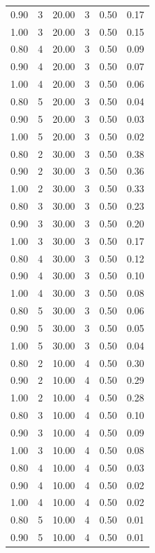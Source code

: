 \documentclass[12pt]{article}
\begin{document}
{{{{\begin{longtable}{cccccc}
  0.90 &   3 & 20.00 &   3 & 0.50 & 0.17 \\ 
  1.00 &   3 & 20.00 &   3 & 0.50 & 0.15 \\ 
  0.80 &   4 & 20.00 &   3 & 0.50 & 0.09 \\ 
  0.90 &   4 & 20.00 &   3 & 0.50 & 0.07 \\ 
  1.00 &   4 & 20.00 &   3 & 0.50 & 0.06 \\ 
  0.80 &   5 & 20.00 &   3 & 0.50 & 0.04 \\ 
  0.90 &   5 & 20.00 &   3 & 0.50 & 0.03 \\ 
  1.00 &   5 & 20.00 &   3 & 0.50 & 0.02 \\ 
  0.80 &   2 & 30.00 &   3 & 0.50 & 0.38 \\ 
  0.90 &   2 & 30.00 &   3 & 0.50 & 0.36 \\ 
  1.00 &   2 & 30.00 &   3 & 0.50 & 0.33 \\ 
  0.80 &   3 & 30.00 &   3 & 0.50 & 0.23 \\ 
  0.90 &   3 & 30.00 &   3 & 0.50 & 0.20 \\ 
  1.00 &   3 & 30.00 &   3 & 0.50 & 0.17 \\ 
  0.80 &   4 & 30.00 &   3 & 0.50 & 0.12 \\ 
  0.90 &   4 & 30.00 &   3 & 0.50 & 0.10 \\ 
  1.00 &   4 & 30.00 &   3 & 0.50 & 0.08 \\ 
  0.80 &   5 & 30.00 &   3 & 0.50 & 0.06 \\ 
  0.90 &   5 & 30.00 &   3 & 0.50 & 0.05 \\ 
  1.00 &   5 & 30.00 &   3 & 0.50 & 0.04 \\ 
  0.80 &   2 & 10.00 &   4 & 0.50 & 0.30 \\ 
  0.90 &   2 & 10.00 &   4 & 0.50 & 0.29 \\ 
  1.00 &   2 & 10.00 &   4 & 0.50 & 0.28 \\ 
  0.80 &   3 & 10.00 &   4 & 0.50 & 0.10 \\ 
  0.90 &   3 & 10.00 &   4 & 0.50 & 0.09 \\ 
  1.00 &   3 & 10.00 &   4 & 0.50 & 0.08 \\ 
  0.80 &   4 & 10.00 &   4 & 0.50 & 0.03 \\ 
  0.90 &   4 & 10.00 &   4 & 0.50 & 0.02 \\ 
  1.00 &   4 & 10.00 &   4 & 0.50 & 0.02 \\ 
  0.80 &   5 & 10.00 &   4 & 0.50 & 0.01 \\ 
  0.90 &   5 & 10.00 &   4 & 0.50 & 0.01 \\ 

\end{longtable}}}}}
\end{document}
